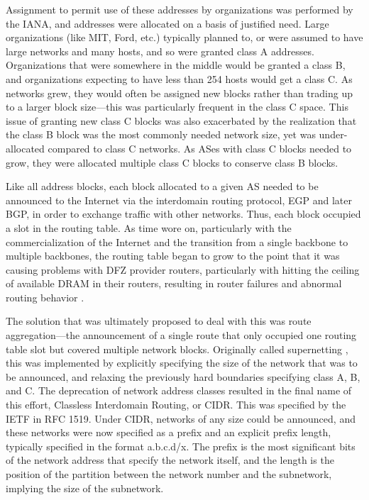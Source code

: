 Assignment to permit use of these addresses by organizations was performed by the IANA, and addresses were allocated on a basis of justified need. Large organizations (like MIT, Ford, etc.) typically planned to, or were assumed to have large networks and many hosts, and so were granted class A addresses. Organizations that were somewhere in the middle would be granted a class B, and organizations expecting to have less than 254 hosts would get a class C. As networks grew, they would often be assigned new blocks rather than trading up to a larger block size---this was particularly frequent in the class C space. This issue of granting new class C blocks was also exacerbated by the realization that the class B block was the most commonly needed network size, yet was under-allocated compared to class C networks. As ASes with class C blocks needed to grow, they were allocated multiple class C blocks to conserve class B blocks.

Like all address blocks, each block allocated to a given AS needed to be announced to the Internet via the interdomain routing protocol, EGP and later BGP, in order to exchange traffic with other networks. Thus, each block occupied a slot in the routing table. As time wore on, particularly with the commercialization of the Internet and the transition from a single backbone to multiple backbones, the routing table began to grow to the point that it was causing problems with DFZ provider routers, particularly with hitting the ceiling of available DRAM in their routers, resulting in router failures and abnormal routing behavior \cite{tony li conversation}.


The solution that was ultimately proposed to deal with this was route aggregation---the announcement of a single route that only occupied one routing table slot but covered multiple network blocks. Originally called supernetting \cite{RFC1338}, this was implemented by explicitly specifying the size of the network that was to be announced, and relaxing the previously hard boundaries specifying class A, B, and C. The deprecation of network address classes resulted in the final name of this effort, Classless Interdomain Routing, or CIDR. This was specified by the IETF in RFC 1519. Under CIDR, networks of any size could be announced, and these networks were now specified as a prefix and an explicit prefix length, typically specified in the format a.b.c.d/x. The prefix is the most significant bits of the network address that specify the network itself, and the length is the position of the partition between the network number and the subnetwork, implying the size of the subnetwork.

